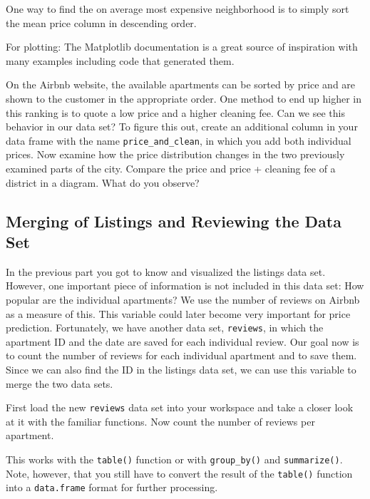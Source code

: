 \documentclass[
  11pt,
]{article}
\newenvironment{tips}[1]
  {
  \begin{itemize}
  \footnotesize
  \renewcommand{\labelitemi}{
    \raisebox{-.7\height}[0pt][0pt]{
      {\setkeys{Gin}{width=3em,keepaspectratio}
        \texttt{[image: images/\#1.png]}}
    }
  }
  \setlength{\fboxsep}{1em}
  \begin{rbox}
  \item
  }
  {
  \end{rbox}
  \end{itemize}
  }
\newenvironment{tipsp}[1]
  {
  \begin{itemize}
  \footnotesize
  \renewcommand{\labelitemi}{
    \raisebox{-.7\height}[0pt][0pt]{
      {\setkeys{Gin}{width=3em,keepaspectratio}
        \texttt{[image: images/\#1.png]}}
    }
  }
  \setlength{\fboxsep}{1em}
  \begin{pbox}
  \item
  }
  {
  \end{pbox}
  \end{itemize}
  }
\begin{document}
\begin{tipsp}p

One way to find the on average most expensive neighborhood is to simply sort the mean price column in descending order.

For plotting: The Matplotlib documentation is a great source of inspiration with many examples including code that generated them.

\end{tipsp}

On the Airbnb website, the available apartments can be sorted by price and are shown to the customer in the appropriate order. One method to end up higher in this ranking is to quote a low price and a higher cleaning fee. Can we see this behavior in our data set? To figure this out, create an additional column in your data frame with the name \texttt{price\_and\_clean}, in which you add both individual prices. Now examine how the price distribution changes in the two previously examined parts of the city. Compare the price and price + cleaning fee of a district in a diagram. What do you observe?

\hypertarget{merging-of-listings-and-reviewing-the-data-set}{%
\subsection{Merging of Listings and Reviewing the Data Set}\label{merging-of-listings-and-reviewing-the-data-set}}

In the previous part you got to know and visualized the listings data set. However, one important piece of information is not included in this data set: How popular are the individual apartments? We use the number of reviews on Airbnb as a measure of this. This variable could later become very important for price prediction. Fortunately, we have another data set, \texttt{reviews}, in which the apartment ID and the date are saved for each individual review. Our goal now is to count the number of reviews for each individual apartment and to save them. Since we can also find the ID in the listings data set, we can use this variable to merge the two data sets.

First load the new \texttt{reviews} data set into your workspace and take a closer look at it with the familiar functions. Now count the number of reviews per apartment.

\begin{tips}r

This works with the \texttt{table()} function or with \texttt{group\_by()} and \texttt{summarize()}. Note, however, that you still have to convert the result of the \texttt{table()} function into a \texttt{data.frame} format for further processing.

\end{tips}
\end{document}
